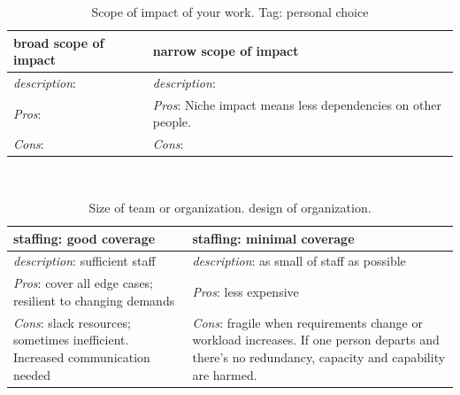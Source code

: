 \begin{center}
\begin{table}[ht]
\begin{tabular}{ | m{\dilemmatablewidth}| m{\dilemmatablewidth} | } 
  \hline
  \textbf{broad scope of impact} &
  \textbf{narrow scope of impact} \\
  \hline
  \textit{description}:  &
  \textit{description}:  \\  
  \hline
  \textit{Pros}:  &
  \textit{Pros}: Niche impact means less dependencies on other people. \\
  \hline
  \textit{Cons}: & 
  \textit{Cons}: \\
  \hline
\end{tabular}
\caption{Scope of impact of your work. 
{\tiny Tag: personal choice}}
\end{table}
\label{table:scope_broad-vs-narrow}
\end{center}

\ \\

\begin{center}
\begin{table}[ht]
\begin{tabular}{ | m{\dilemmatablewidth}| m{\dilemmatablewidth} | } 
  \hline
  \textbf{staffing: good coverage} &
  \textbf{staffing: minimal coverage} \\
  \hline
  \textit{description}: sufficient staff &
  \textit{description}: as small of staff as possible \\  
  \hline
  \textit{Pros}: cover all edge cases; resilient to changing demands &
  \textit{Pros}: less expensive \\
  \hline
  \textit{Cons}: slack resources; sometimes inefficient. Increased communication needed & 
  \textit{Cons}: fragile when requirements change or workload increases. If one person departs and there's no redundancy, capacity and capability are harmed.  \\
  \hline
\end{tabular}
\caption{Size of team or organization.
{\tiny design of organization.}
}
\label{table:staff_many-vs-few}
\end{table}
\end{center}


\ \\

